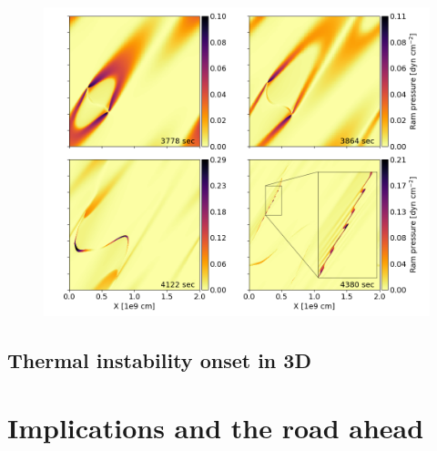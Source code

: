 \begin{figure}[t]
  \centering
  \includegraphics[width=\textwidth]{2d_ram_pressure.png}
\end{figure}




\subsection{Thermal instability onset in 3D}

\section{Implications and the road ahead}
\cleardoublepage
